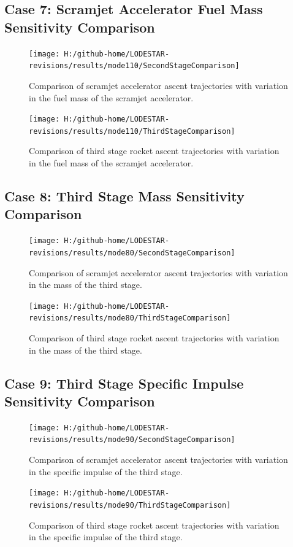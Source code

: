 \subsection{Case 7: Scramjet Accelerator Fuel Mass Sensitivity Comparison}\label{sec:app_comparison110}
\begin{figure}[!th]
\centering
\texttt{[image: H:/github-home/LODESTAR-revisions/results/mode110/SecondStageComparison]}
\caption{Comparison of scramjet accelerator ascent trajectories with variation in the fuel mass of the scramjet accelerator.}
\label{fig:SecondStageComparison5}
\end{figure}
\begin{figure}[!th]
\centering
\texttt{[image: H:/github-home/LODESTAR-revisions/results/mode110/ThirdStageComparison]}
\caption{Comparison of third stage rocket ascent trajectories with variation in the fuel mass of the scramjet accelerator.}
\label{fig:ThirdStageComparison5}
\end{figure}
\FloatBarrier
\clearpage
\subsection{Case 8: Third Stage Mass Sensitivity Comparison}\label{sec:app_comparison80}
\begin{figure}[!th]
\centering
\texttt{[image: H:/github-home/LODESTAR-revisions/results/mode80/SecondStageComparison]}
\caption{Comparison of scramjet accelerator ascent trajectories with variation in the mass of the third stage.}
\label{fig:SecondStageComparison6}
\end{figure}
\begin{figure}[!th]
\centering
\texttt{[image: H:/github-home/LODESTAR-revisions/results/mode80/ThirdStageComparison]}
\caption{Comparison of third stage rocket ascent trajectories with variation in the mass of the third stage.}
\label{fig:ThirdStageComparison6}
\end{figure}
\FloatBarrier
\clearpage
\subsection{Case 9: Third Stage Specific Impulse Sensitivity Comparison}\label{sec:app_comparison90}
\begin{figure}[!th]
	\centering
	\texttt{[image: H:/github-home/LODESTAR-revisions/results/mode90/SecondStageComparison]}
	\caption{Comparison of scramjet accelerator ascent trajectories with variation in the specific impulse of the third stage.}
	\label{fig:SecondStageComparison7}
\end{figure}
\begin{figure}[!th]
\centering
\texttt{[image: H:/github-home/LODESTAR-revisions/results/mode90/ThirdStageComparison]}
\caption{Comparison of third stage rocket ascent trajectories with variation in the specific impulse of the third stage.}
\label{fig:ThirdStageComparison7}
\end{figure}
\FloatBarrier
\clearpage

